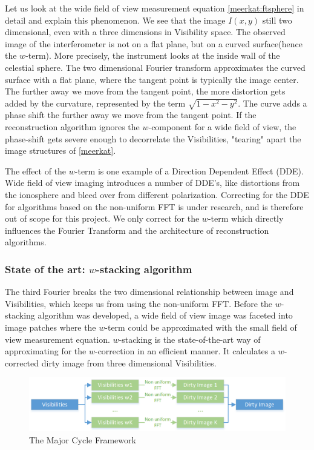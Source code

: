 Let us look at the wide field of view measurement equation \eqref{meerkat:ftsphere} in detail and explain this phenomenon. We see that the image $I(x,y)$ still two dimensional, even with a three dimensions in Visibility space. The observed image of the interferometer is not on a flat plane, but on a curved surface(hence the $w$-term)\cite{mcewen2011compressed}. More precisely, the instrument looks at the inside wall of the celestial sphere. The two dimensional Fourier transform approximates the curved surface with a flat plane, where the tangent point is typically the image center. The further away we move from the tangent point, the more distortion gets added by the curvature, represented by the term $\sqrt{1 - x^2 - y ^2}$. The curve adds a phase shift the further away we move from the tangent point. If the reconstruction algorithm ignores the $w$-component for a wide field of view, the phase-shift gets severe enough to decorrelate the Visibilities, "tearing" apart the image structures of \eqref{meerkat}.

The effect of the $w$-term is one example of a Direction Dependent Effect (DDE). Wide field of view imaging introduces a number of DDE's, like distortions from the ionosphere and bleed over from different polarization. Correcting for the DDE for algorithms based on the non-uniform FFT is under research\cite{intema2009ionospheric}, and is therefore out of scope for this project. We only correct for the $w$-term which directly influences the Fourier Transform and the architecture of reconstruction algorithms. 


\subsubsection{State of the art: $w$-stacking algorithm}
The third Fourier breaks the two dimensional relationship between image and Visibilities, which keeps us from using the non-uniform FFT. Before the $w$-stacking algorithm was developed, a wide field of view image was faceted into image patches where the $w$-term could be approximated with the small field of view measurement equation. $w$-stacking is the state-of-the-art way of approximating for the $w$-correction in an efficient manner. It calculates a $w$-corrected dirty image from three dimensional Visibilities.

\begin{figure}
	\centering
	\vspace{-10pt}
	\includegraphics[width=1.0\linewidth]{./chapters/03.challenges/w-stacks.png}
	\caption{The Major Cycle Framework}
	\label{meerkat:w-stacks}
	\vspace{-10pt}
\end{figure}

